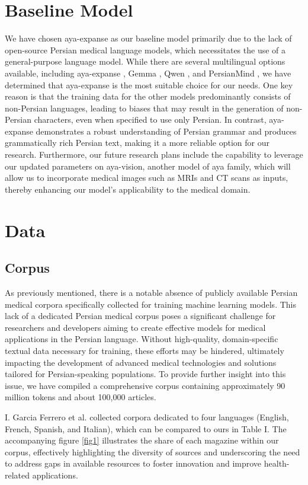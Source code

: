 \documentclass[conference]{IEEEtran}
\begin{document}
\section{Baseline Model}
We have chosen aya-expanse as our baseline model primarily due to the lack of open-source Persian medical language models, which necessitates the use of a general-purpose language model. While there are several multilingual options available, including aya-expanse \cite{b5}, Gemma \cite{b14}, Qwen \cite{b15}, and PersianMind \cite{b16}, we have determined that aya-expanse is the most suitable choice for our needs. One key reason is that the training data for the other models predominantly consists of non-Persian languages, leading to biases that may result in the generation of non-Persian characters, even when specified to use only Persian. In contrast, aya-expanse demonstrates a robust understanding of Persian grammar and produces grammatically rich Persian text, making it a more reliable option for our research. Furthermore, our future research plans include the capability to leverage our updated parameters on aya-vision, another model of aya family, which will allow us to incorporate medical images such as MRIs and CT scans as inputs, thereby enhancing our model’s applicability to the medical domain.
\section{Data}

\subsection{Corpus}
As previously mentioned, there is a notable absence of publicly available Persian medical corpora specifically collected for training machine learning models. This lack of a dedicated Persian medical corpus poses a significant challenge for researchers and developers aiming to create effective models for medical applications in the Persian language. Without high-quality, domain-specific textual data necessary for training, these efforts may be hindered, ultimately impacting the development of advanced medical technologies and solutions tailored for Persian-speaking populations. To provide further insight into this issue, we have compiled a comprehensive corpus containing approximately 90 million tokens and about 100,000 articles. 

I. Garcia Ferrero et al.
\cite{b17}
collected corpora dedicated to four languages (English, French, Spanish, and Italian), which can be compared to ours in Table I. The accompanying figure \ref{fig1} illustrates the share of each magazine within our corpus, effectively highlighting the diversity of sources and underscoring the need to address gaps in available resources to foster innovation and improve health-related applications.
\end{document}
